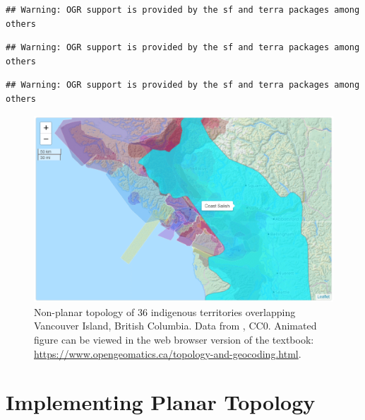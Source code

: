 \documentclass[
]{book}
\begin{document}
\begin{verbatim}
## Warning: OGR support is provided by the sf and terra packages among others
\end{verbatim}

\begin{verbatim}
## Warning: OGR support is provided by the sf and terra packages among others
\end{verbatim}

\begin{verbatim}
## Warning: OGR support is provided by the sf and terra packages among others
\end{verbatim}





\begin{figure}
\includegraphics[width=0.75\linewidth]{images/07-native-land-leaflet} \caption{Non-planar topology of 36 indigenous territories overlapping Vancouver Island, British Columbia. Data from \citet{native_land_native_nodate}, CC0. Animated figure can be viewed in the web browser version of the textbook: \url{https://www.opengeomatics.ca/topology-and-geocoding.html}.}\label{fig:7-native-land-leaflet}
\end{figure}

\hypertarget{implementing-planar-topology}{%
\section{Implementing Planar Topology}\label{implementing-planar-topology}}
\end{document}
